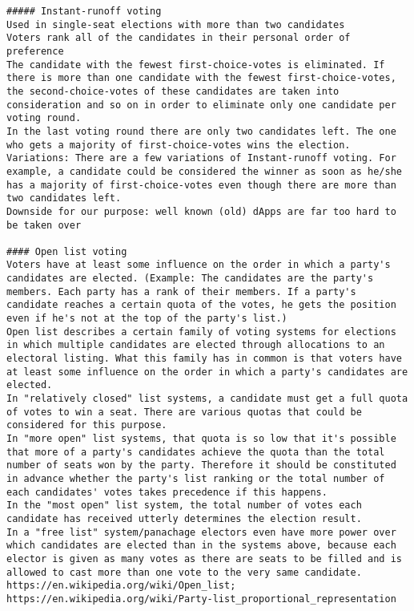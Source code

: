 \begin{enumerate}
{{\begin{verbatim}
##### Instant-runoff voting 
Used in single-seat elections with more than two candidates 
Voters rank all of the candidates in their personal order of preference
The candidate with the fewest first-choice-votes is eliminated. If there is more than one candidate with the fewest first-choice-votes, the second-choice-votes of these candidates are taken into consideration and so on in order to eliminate only one candidate per voting round. 
In the last voting round there are only two candidates left. The one who gets a majority of first-choice-votes wins the election. 
Variations: There are a few variations of Instant-runoff voting. For example, a candidate could be considered the winner as soon as he/she has a majority of first-choice-votes even though there are more than two candidates left. 
Downside for our purpose: well known (old) dApps are far too hard to be taken over

#### Open list voting
Voters have at least some influence on the order in which a party's candidates are elected. (Example: The candidates are the party's members. Each party has a rank of their members. If a party's candidate reaches a certain quota of the votes, he gets the position even if he's not at the top of the party's list.) 
Open list describes a certain family of voting systems for elections in which multiple candidates are elected through allocations to an electoral listing. What this family has in common is that voters have at least some influence on the order in which a party's candidates are elected. 
In "relatively closed" list systems, a candidate must get a full quota of votes to win a seat. There are various quotas that could be considered for this purpose. 
In "more open" list systems, that quota is so low that it's possible that more of a party's candidates achieve the quota than the total number of seats won by the party. Therefore it should be constituted in advance whether the party's list ranking or the total number of each candidates' votes takes precedence if this happens.
In the "most open" list system, the total number of votes each candidate has received utterly determines the election result. 
In a "free list" system/panachage electors even have more power over which candidates are elected than in the systems above, because each elector is given as many votes as there are seats to be filled and is allowed to cast more than one vote to the very same candidate.
https://en.wikipedia.org/wiki/Open_list; https://en.wikipedia.org/wiki/Party-list_proportional_representation


\end{verbatim}}}
\end{enumerate}
